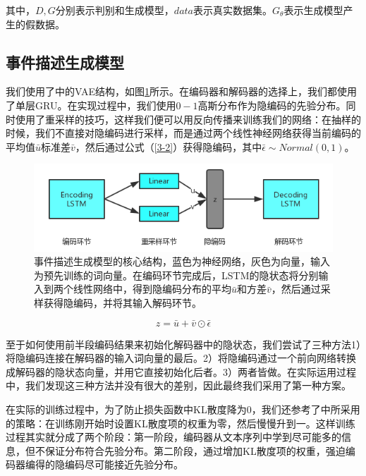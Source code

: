 其中，$D,G$分别表示判别和生成模型，$data$表示真实数据集。$G_\theta$表示生成模型产生的假数据。

\subsection{事件描述生成模型}
我们使用了\cite{bowman_generating_2015}中的VAE结构，如图\ref{f3-2}所示。在编码器和解码器的选择上，我们都使用了单层GRU。在实现过程中，我们使用$0-1$高斯分布作为隐编码的先验分布。同时使用了重采样\cite{kingma_auto-encoding_2013}的技巧，这样我们便可以用反向传播来训练我们的网络：在抽样的时候，我们不直接对隐编码进行采样，而是通过两个线性神经网络获得当前编码的平均值$\bar{u}$标准差$\bar{v}$，然后通过公式（\ref{3-2}）获得隐编码，其中$\bar\epsilon \sim Normal(0,1)$。
\begin{figure}[htb]\label{f3-2}
    \centering
    \includegraphics[width=11.3cm]{vae.png}
    \caption{事件描述生成模型的核心结构，蓝色为神经网络，灰色为向量，输入为预先训练的词向量。在编码环节完成后，LSTM的隐状态将分别输入到两个线性网络中，得到隐编码分布的平均$\bar{u}$和方差$\bar{v}$，然后通过采样获得隐编码，并将其输入解码环节。}
\end{figure}
\begin{equation}\label{3-2}
    z=\bar{u}+\bar{v}\odot \bar\epsilon
\end{equation}

至于如何使用前半段编码结果来初始化解码器中的隐状态，我们尝试了三种方法1）将隐编码连接在解码器的输入词向量的最后。2）将隐编码通过一个前向网络转换成解码器的隐状态向量，并用它直接初始化后者。3）两者皆做。在实际运用过程中，我们发现这三种方法并没有很大的差别，因此最终我们采用了第一种方案。

在实际的训练过程中，为了防止损失函数中KL散度降为0，我们还参考了\cite{bowman_generating_2015}中所采用的策略：在训练刚开始时设置KL散度项的权重为零，然后慢慢升到一。这样训练过程其实就分成了两个阶段：第一阶段，编码器从文本序列中学到尽可能多的信息，但不保证分布符合先验分布。第二阶段，通过增加KL散度项的权重，强迫编码器编得的隐编码尽可能接近先验分布。

